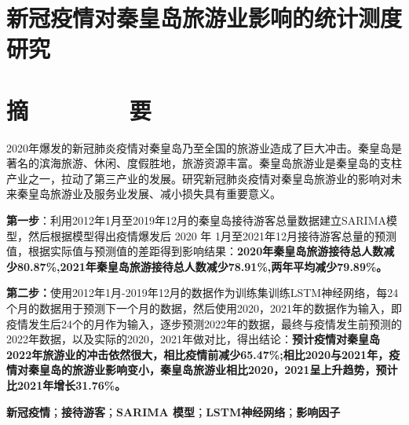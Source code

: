 \section*{\heiti 新冠疫情对秦皇岛旅游业影响的统计测度研究}
\section*{\heiti 摘\ \ \ \ \ \ \ \ 要}

2020年爆发的新冠肺炎疫情对秦皇岛乃至全国的旅游业造成了巨大冲击。秦皇岛是著名的滨海旅游、休闲、度假胜地，旅游资源丰富。秦皇岛旅游业是秦皇岛的支柱产业之一，拉动了第三产业的发展。研究新冠肺炎疫情对秦皇岛旅游业的影响对未来秦皇岛旅游业及服务业发展、减小损失具有重要意义。

\textbf{第一步}：利用2012年1月至2019年12月的秦皇岛接待游客总量数据建立SARIMA模型，然后根据模型得出疫情爆发后 2020 年 1月至2021年12月接待游客总量的预测值，根据实际值与预测值的差距得到影响结果：\textbf{2020年秦皇岛旅游接待总人数减少80.87\%,2021年秦皇岛旅游接待总人数减少78.91\%,两年平均减少79.89\%。}

\textbf{第二步：}使用2012年1月-2019年12月的数据作为训练集训练LSTM神经网络，每24个月的数据用于预测下一个月的数据，然后使用2020，2021年的数据作为输入，即疫情发生后24个的月作为输入，逐步预测2022年的数据，最终与疫情发生前预测的2022年数据，以及实际的2020，2021年做对比，得出结论：\textbf{预计疫情对秦皇岛2022年旅游业的冲击依然很大，相比疫情前减少65.47\%;相比2020与2021年，疫情对秦皇岛的旅游业影响变小，秦皇岛旅游业相比2020，2021呈上升趋势，预计比2021年增长31.76\%。
}
\par
 
 
 \par

\noindent {}\textbf{新冠疫情}；\textbf{接待游客}；\textbf{SARIMA 模型}；\textbf{LSTM神经网络}；\textbf{影响因子}

\clearpage






